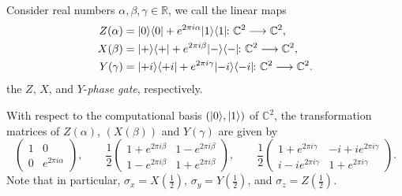 \documentclass[a4paper, oneside, 12pt]{amsart}
\begin{document}
\begin{definition}\label{def:rotations-on-bloch-sphere}
  Consider real numbers \(\alpha, \beta,\gamma \in \mathbb{R}\), we call the linear maps
  \begin{subequations}
    \begin{align}
      Z(\alpha) &= \ket{0}\bra{0} + e^{2\pi i \alpha}\ket{1}\bra{1} \from \mathbb{C}^{2} \to \mathbb{C}^{2}, \\
      X(\beta) &= \ket{+}\bra{+} + e^{2\pi i \beta}\ket{-}\bra{-} \from \mathbb{C}^{2} \to \mathbb{C}^{2}, \\
      Y(\gamma) &= \ket{+i}\bra{+i} + e^{2\pi i \gamma}\ket{-i}\bra{-i} \from \mathbb{C}^{2}\to \mathbb{C}^{2}.
    \end{align}
  \end{subequations}
  the \(Z\), \(X\), and \(Y\)-\emph{phase gate}, respectively.
\end{definition}
With respect to the computational basis \((\lvert0\rangle, \lvert1\rangle)\) of \( \mathbb{C}^{2}\), the transformation matrices of \(Z(\alpha)\), \((X(\beta))\) and \(Y(\gamma)\) are given by
\begin{equation}\label{eq:trafo-matrices-of-z-x-y-gates}
  \begin{pmatrix}
    1 & 0 \\
    0 & e^{2\pi i \alpha}
  \end{pmatrix}, \qquad
  \frac{1}{2}
  \begin{pmatrix}
    1+ e^{2\pi i \beta}  & 1 - e^{2\pi i \beta} \\
    1 - e^{2\pi i \beta} & 1 +  e^{2\pi i \beta}
  \end{pmatrix}, \qquad
  \frac{1}{2}
  \begin{pmatrix}
    1 + e^{2\pi i \gamma}  & -i + ie^{2 \pi i \gamma} \\
    i - ie^{2\pi i \gamma} & 1 + e^{2 \pi i \gamma}
  \end{pmatrix}.
\end{equation}
Note that in particular, \(\sigma_{x} = X(\tfrac{1}{2})\), \(\sigma_{y} = Y(\tfrac{1}{2})\), and \(\sigma_{z} = Z(\tfrac{1}{2})\).
\end{document}
